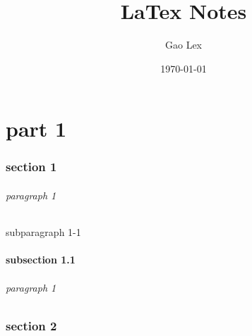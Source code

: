 \documentclass{article}
\title{LaTex Notes}
\author{Gao Lex}
\date{\today}
\begin{document}
    \part{part 1}
    \section{section 1}
    \paragraph{paragraph 1}
    \subparagraph{subparagraph 1-1}
    \subsection{subsection 1.1}
    \paragraph{paragraph 1}
    \section*{section 2}

    \listoffigures%
    \listoftables%

\end{document}
